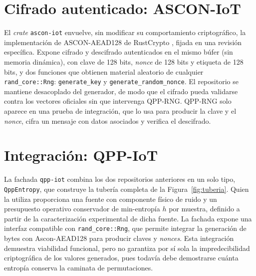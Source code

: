 \section{Cifrado autenticado: ASCON-IoT}
\label{sec:ascon_iot}

El \textit{crate} \texttt{ascon-iot} envuelve, sin modificar su comportamiento criptográfico, la implementación de ASCON-AEAD128 de RustCrypto \cite{RustCryptoAEADs}, fijada en una revisión específica. Expone cifrado y descifrado autenticados en el mismo búfer (sin memoria dinámica), con clave de 128 bits, \textit{nonce} de 128 bits y etiqueta de 128 bits, y dos funciones que obtienen material aleatorio de cualquier \texttt{rand\_core::Rng}: \texttt{generate\_key} y \texttt{generate\_random\_nonce}. El repositorio se mantiene desacoplado del generador, de modo que el cifrado pueda validarse contra los vectores oficiales sin que intervenga QPP-RNG. QPP-RNG solo aparece en una prueba de integración, que lo usa para producir la clave y el \textit{nonce}, cifra un mensaje con datos asociados y verifica el descifrado.

\section{Integración: QPP-IoT}
\label{sec:qpp_iot}

La fachada \texttt{qpp-iot} combina los dos repositorios anteriores en un solo tipo, \texttt{QppEntropy}, que construye la tubería completa de la Figura~\ref{fig:tuberia}. Quien la utiliza proporciona una fuente con componente físico de ruido y un presupuesto operativo conservador de min-entropía $h$ por muestra, definido a partir de la caracterización experimental de dicha fuente. La fachada expone una interfaz compatible con \texttt{rand\_core::Rng}, que permite integrar la generación de bytes con Ascon-AEAD128 para producir claves y \textit{nonces}. Esta integración demuestra viabilidad funcional, pero no garantiza por sí sola la impredecibilidad criptográfica de los valores generados, pues todavía debe demostrarse cuánta entropía conserva la caminata de permutaciones.

